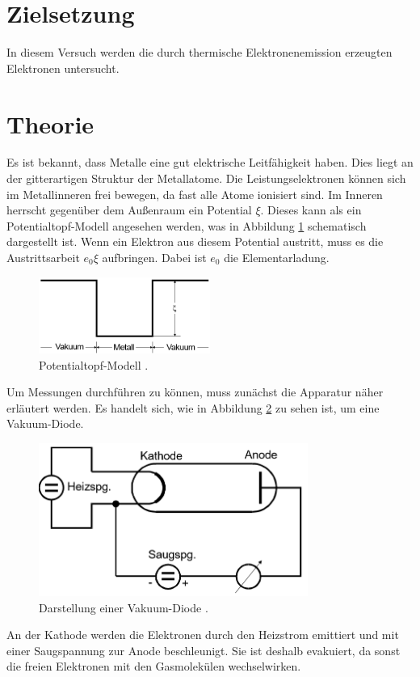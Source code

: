 \section{Zielsetzung}
In diesem Versuch werden die durch thermische Elektronenemission erzeugten Elektronen untersucht.
\section{Theorie}
Es ist bekannt, dass Metalle eine gut elektrische Leitfähigkeit haben. Dies liegt an der gitterartigen Struktur der Metallatome.
Die Leistungselektronen können sich im Metallinneren frei bewegen, da fast alle Atome ionisiert sind. Im Inneren herrscht gegenüber dem
Außenraum ein Potential $\xi$.
Dieses kann als ein Potentialtopf-Modell angesehen werden, was in Abbildung \ref{abb:1} schematisch
dargestellt ist. Wenn ein Elektron aus diesem Potential austritt, muss
es die Austrittsarbeit $e_0 \xi$ aufbringen. Dabei ist $e_0$ die Elementarladung.
\begin{figure}[H]
  \centering
  \includegraphics[width=5 cm, height= 2.5cm]{content/Potentialtopf.png}
  \caption{Potentialtopf-Modell \cite{1}.}
  \label{abb:1}
\end{figure}
Um Messungen durchführen zu können, muss zunächst die Apparatur näher erläutert werden.
Es handelt sich, wie in  Abbildung \ref{abb:2} zu sehen ist, um eine Vakuum-Diode.
\begin{figure}[H]
  \centering
  \includegraphics[width=10 cm, height =5cm]{content/Aufbau.png}
  \caption{Darstellung einer Vakuum-Diode \cite{1}.}
  \label{abb:2}
\end{figure}
An der Kathode werden die Elektronen durch den Heizstrom emittiert und mit einer Saugspannung zur
Anode beschleunigt. Sie ist deshalb evakuiert, da sonst die freien Elektronen mit den Gasmolekülen wechselwirken.
